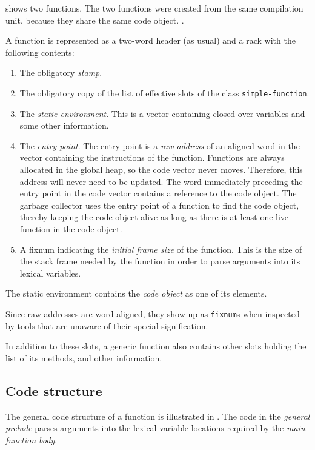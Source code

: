  shows two functions.  The two
functions were created from the same compilation unit, because they
share the same code object. .

A function is represented as a two-word header (as usual) and a
rack with the following contents:

\begin{enumerate}
\item The obligatory \emph{stamp}.
\item The obligatory copy of the list of effective slots of the class
  \texttt{simple-function}.
\item The \emph{static environment}.  This is a vector containing
  closed-over variables and some other information.
\item The \emph{entry point}.  The entry
  point is a \emph{raw address} of an aligned word in the vector
  containing the instructions of the function.  Functions are always
  allocated in the global heap, so the code vector never moves.
  Therefore, this address will never need to be updated.  The word
  immediately preceding the entry point in the code vector contains a
  reference to the code object.  The garbage collector uses the entry
  point of a function to find the code object, thereby keeping the
  code object alive as long as there is at least one live function in
  the code object.
\item A fixnum indicating the \emph{initial frame size} of the
  function.  This is the size of the stack frame needed by the
  function in order to parse arguments into its lexical variables.
\end{enumerate}

The static environment contains the \emph{code object} as one of its
elements.

Since raw addresses are word aligned, they show up as \texttt{fixnum}s
when inspected by tools that are unaware of their special
signification.

In addition to these slots, a generic function also contains other
slots holding the list of its methods, and other information.

\subsection{Code structure}
\label{sec-function-code-structure}

The general code structure of a function is illustrated in
.  The code in the \emph{general
  prelude} parses arguments into the lexical variable locations
required by the \emph{main function body}.


